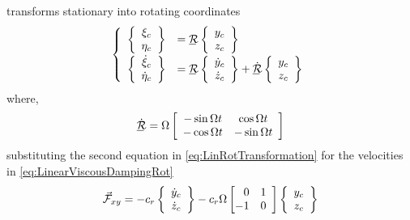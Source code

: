 transforms stationary into rotating coordinates 
\begin{equation}\label{eq:LinRotTransformation}
\left\{\begin{array}{rl}
\left\{\begin{array}{c}
\xi_c\\
\eta_c
\end{array}\right\}&=\bunderline{\mathcal{R}}\left\{\begin{array}{c}
y_c\\
z_c
\end{array}\right\}\\
&\\[-1em]
\left\{\begin{array}{c}
\dot{\xi}_c\\
\dot{\eta}_c
\end{array}\right\}&=\bunderline{\mathcal{R}}\left\{\begin{array}{c}
\dot{y}_c\\
\dot{z}_c
\end{array}\right\}+\dot{\bunderline{\mathcal{R}}}\left\{\begin{array}{c}
y_c\\
z_c
\end{array}\right\}
\end{array}\right.
\end{equation}
where, \begin{equation}
\dot{\bunderline{\mathcal{R}}}=\Omega\left[\begin{array}{cc}
-\sin{\Omega t}& \cos{\Omega t}\\
-\cos{\Omega t}& -\sin{\Omega t}
\end{array}\right]
\end{equation}
substituting the second equation in \ref{eq:LinRotTransformation} for the velocities in \ref{eq:LinearViscousDampingRot}
\begin{equation}\label{eq:LinearViscousDampingTrans}
\vec{\mathcal{F}}_{xy}=-c_r\left\{\begin{array}{c}
\dot{y}_c\\
\dot{z}_c
\end{array}\right\}-c_r\Omega\left[\begin{array}{@{}rc}
0&1\\
-1&0
\end{array}\right]\left\{\begin{array}{c}
y_c\\
z_c
\end{array}\right\}
\end{equation} 
